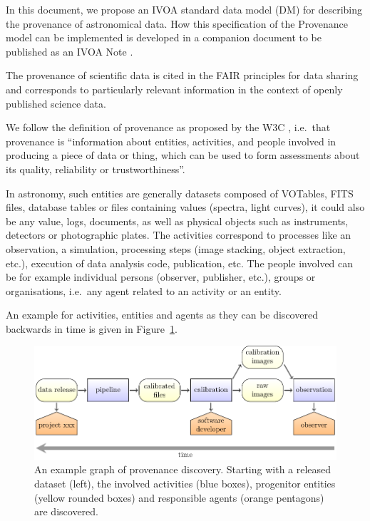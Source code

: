 
In this document, we propose an IVOA standard data model (DM) for describing the provenance of astronomical data. 
How this specification of the Provenance model can be implemented is developed in a companion document to be published as an IVOA Note \citep{std:ProvenanceImplementationNote}.

The provenance of scientific data is cited in the FAIR principles for data sharing \citep{FAIR-principles} and corresponds to particularly relevant information in the context of openly published science data.

We follow the definition of provenance as proposed by the W3C \citep{std:W3CProvDM}, i.e.~that provenance is ``information about entities, activities, and people involved in producing a piece of data or thing, which can be used to form assessments about its quality, reliability or trustworthiness''.

In astronomy, such entities are generally datasets composed of VOTables, FITS files, database tables or files containing values (spectra, light curves),  it could also be any value, logs, documents, as well as physical objects such as instruments, detectors or photographic plates.
The activities correspond to processes like an observation, a simulation, processing steps (image stacking, object extraction, etc.), execution of data analysis code, publication, etc.
The people involved can be for example individual persons (observer, publisher, etc.), groups or organisations, i.e.~any agent related to an activity or an entity.

An example for activities, entities and agents as they can be discovered backwards in time is given in Figure~\ref{fig:example-workflow}.


\begin{figure}[ht]
\centering
\includegraphics[width=1\textwidth]{workflow-backwards.pdf}
\caption[Example graph of provenance discovery]{An example graph of provenance discovery. Starting with a released dataset (left), the involved activities (blue boxes), 
progenitor entities (yellow rounded boxes) and responsible agents (orange pentagons) are 
discovered.}
\label{fig:example-workflow}
\end{figure}


